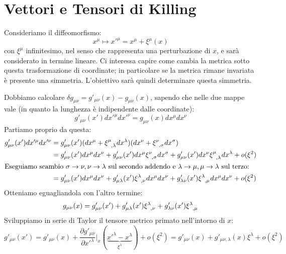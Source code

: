 \section{Vettori e Tensori di Killing}\label{para.killing}
Consideriamo il diffeomorfismo:
\begin{equation*}
    x^\mu \mapsto x'^\mu = x^\mu + \xi^\mu(x)
\end{equation*}
con $\xi^\mu$ infinitesimo, nel senso che rappresenta una perturbazione di $x$, e sarà considerato in termine lineare. Ci interessa capire come cambia la metrica sotto questa trasformazione di coordinate; in particolare se la metrica rimane invariata è presente una simmetria. L'obiettivo sarà quindi determinare questa simmetria.

Dobbiamo calcolare $\delta g_{\mu\nu} = g'_{\mu\nu}(x) - g_{\mu\nu}(x)$, sapendo che nelle due mappe vale (in quanto la lunghezza è indipendente dalle coordinate):
\begin{equation*}
    g'_{\mu\nu}(x') dx'^\mu dx'^\nu = g_{\mu\nu}(x) dx^\mu dx^\nu
\end{equation*}
Partiamo proprio da questa:
\begin{align*}
  g'_{\mu\nu}(x') dx'^\mu dx'^\nu &=  g'_{\mu\nu}(x')(dx^\mu + \tensor{\xi}{^\mu_{,\lambda}}dx^\lambda)(dx^\nu + \tensor{\xi}{^\nu_{,\sigma}}dx^\sigma) \\
    &=  g'_{\mu\nu}(x')dx^\mu dx^\nu +  g'_{\mu\nu}(x')dx^\mu \tensor{\xi}{^\nu_{,\sigma}}dx^\sigma 
    + g'_{\mu\nu}(x')dx^\nu \tensor{\xi}{^\mu_{,\lambda}}dx^\lambda + o(\xi^2)\\
\intertext{Eseguiamo scambio $\sigma \rightarrow \nu, \nu \rightarrow \lambda$ sul secondo addendo e $\lambda \rightarrow \mu, \mu \rightarrow \lambda$  sul terzo:}
    &= g'_{\mu\nu}(x')dx^\mu dx^\nu + g'_{\mu\lambda}(x') \tensor{\xi}{^\lambda_{,\nu}} dx^\mu dx^\nu + g'_{\lambda\nu}(x') \tensor{\xi}{^\lambda_{,\mu}} dx^\mu dx^\nu + o(\xi^2)
\end{align*}
Otteniamo eguagliandola con l'altro termine:
\begin{equation*}
    g_{\mu\nu}(x) = g'_{\mu\nu}(x') + g'_{\mu\lambda}(x') \tensor{\xi}{^\lambda_{,\nu}} + g'_{\lambda\nu}(x') \tensor{\xi}{^\lambda_{,\mu}}
\end{equation*}
Sviluppiamo in serie di Taylor il tensore metrico primato nell'intorno di $x$:
\begin{equation*}
    g'_{\mu\nu}(x') = g'_{\mu\nu}(x) + \frac{\partial g'_{\mu\nu}}{\partial x'^\lambda}\Big|_x (\underbrace{x'^\lambda - x^\lambda}_{\xi^\lambda}) + o(\xi^2) = g'_{\mu\nu}(x) + g'_{\mu\nu , \lambda}(x) \xi^\lambda + o(\xi^2)
\end{equation*}
